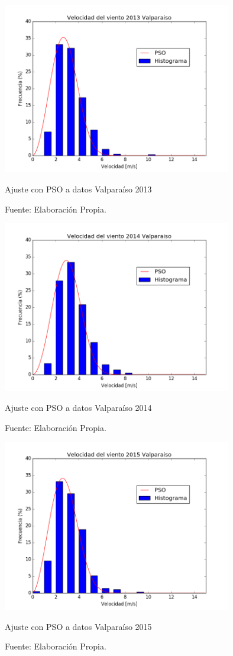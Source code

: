 \begin{figure}[h!]
    \centering
    \includegraphics[height=75mm]{figures/result_2013.png}
    \caption{Ajuste con PSO a datos Valparaíso 2013}
    \vspace{-.25cm}
    \caption*{Fuente: Elaboración Propia.}
    \label{fig:pso_valpo_13}
\end{figure}
\begin{figure}[h!]
    \centering
    \includegraphics[height=75mm]{figures/result_2014.png}
    \caption{Ajuste con PSO a datos Valparaíso 2014}
    \vspace{-.25cm}
    \caption*{Fuente: Elaboración Propia.}
    \label{fig:pso_valpo_14}
\end{figure}
\begin{figure}[h!]
    \centering
    \includegraphics[height=75mm]{figures/result_2015.png}
    \caption{Ajuste con PSO a datos Valparaíso 2015}
    \vspace{-.25cm}
    \caption*{Fuente: Elaboración Propia.}
    \label{fig:pso_valpo_15}
\end{figure}
